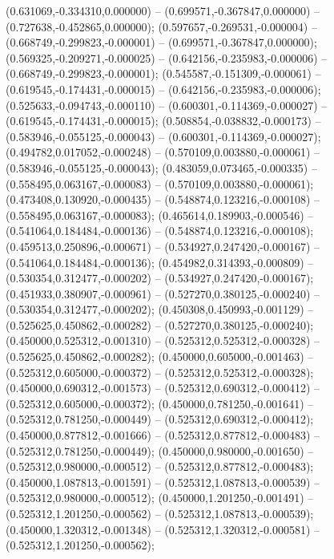  (0.631069,-0.334310,0.000000) -- (0.699571,-0.367847,0.000000) -- (0.727638,-0.452865,0.000000);
 (0.597657,-0.269531,-0.000004) -- (0.668749,-0.299823,-0.000001) -- (0.699571,-0.367847,0.000000);
 (0.569325,-0.209271,-0.000025) -- (0.642156,-0.235983,-0.000006) -- (0.668749,-0.299823,-0.000001);
 (0.545587,-0.151309,-0.000061) -- (0.619545,-0.174431,-0.000015) -- (0.642156,-0.235983,-0.000006);
 (0.525633,-0.094743,-0.000110) -- (0.600301,-0.114369,-0.000027) -- (0.619545,-0.174431,-0.000015);
 (0.508854,-0.038832,-0.000173) -- (0.583946,-0.055125,-0.000043) -- (0.600301,-0.114369,-0.000027);
 (0.494782,0.017052,-0.000248) -- (0.570109,0.003880,-0.000061) -- (0.583946,-0.055125,-0.000043);
 (0.483059,0.073465,-0.000335) -- (0.558495,0.063167,-0.000083) -- (0.570109,0.003880,-0.000061);
 (0.473408,0.130920,-0.000435) -- (0.548874,0.123216,-0.000108) -- (0.558495,0.063167,-0.000083);
 (0.465614,0.189903,-0.000546) -- (0.541064,0.184484,-0.000136) -- (0.548874,0.123216,-0.000108);
 (0.459513,0.250896,-0.000671) -- (0.534927,0.247420,-0.000167) -- (0.541064,0.184484,-0.000136);
 (0.454982,0.314393,-0.000809) -- (0.530354,0.312477,-0.000202) -- (0.534927,0.247420,-0.000167);
 (0.451933,0.380907,-0.000961) -- (0.527270,0.380125,-0.000240) -- (0.530354,0.312477,-0.000202);
 (0.450308,0.450993,-0.001129) -- (0.525625,0.450862,-0.000282) -- (0.527270,0.380125,-0.000240);
 (0.450000,0.525312,-0.001310) -- (0.525312,0.525312,-0.000328) -- (0.525625,0.450862,-0.000282);
 (0.450000,0.605000,-0.001463) -- (0.525312,0.605000,-0.000372) -- (0.525312,0.525312,-0.000328);
 (0.450000,0.690312,-0.001573) -- (0.525312,0.690312,-0.000412) -- (0.525312,0.605000,-0.000372);
 (0.450000,0.781250,-0.001641) -- (0.525312,0.781250,-0.000449) -- (0.525312,0.690312,-0.000412);
 (0.450000,0.877812,-0.001666) -- (0.525312,0.877812,-0.000483) -- (0.525312,0.781250,-0.000449);
 (0.450000,0.980000,-0.001650) -- (0.525312,0.980000,-0.000512) -- (0.525312,0.877812,-0.000483);
 (0.450000,1.087813,-0.001591) -- (0.525312,1.087813,-0.000539) -- (0.525312,0.980000,-0.000512);
 (0.450000,1.201250,-0.001491) -- (0.525312,1.201250,-0.000562) -- (0.525312,1.087813,-0.000539);
 (0.450000,1.320312,-0.001348) -- (0.525312,1.320312,-0.000581) -- (0.525312,1.201250,-0.000562);
